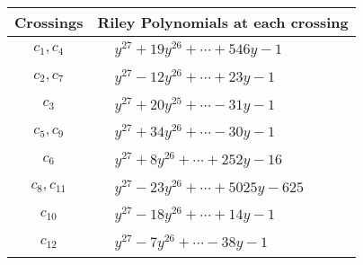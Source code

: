 \documentclass[1p]{elsarticle_modified}
\theoremstyle{definition}
\begin{document}
\begin{tabular}{m{50pt}|m{274pt}}
Crossings & \hspace{64pt}Riley Polynomials at each crossing \\
\hline $$\begin{aligned}c_{1},c_{4}\end{aligned}$$&$\begin{aligned}
&y^{27}+19 y^{26}+\cdots+546 y-1
\end{aligned}$\\
\hline $$\begin{aligned}c_{2},c_{7}\end{aligned}$$&$\begin{aligned}
&y^{27}-12 y^{26}+\cdots+23 y-1
\end{aligned}$\\
\hline $$\begin{aligned}c_{3}\end{aligned}$$&$\begin{aligned}
&y^{27}+20 y^{25}+\cdots-31 y-1
\end{aligned}$\\
\hline $$\begin{aligned}c_{5},c_{9}\end{aligned}$$&$\begin{aligned}
&y^{27}+34 y^{26}+\cdots-30 y-1
\end{aligned}$\\
\hline $$\begin{aligned}c_{6}\end{aligned}$$&$\begin{aligned}
&y^{27}+8 y^{26}+\cdots+252 y-16
\end{aligned}$\\
\hline $$\begin{aligned}c_{8},c_{11}\end{aligned}$$&$\begin{aligned}
&y^{27}-23 y^{26}+\cdots+5025 y-625
\end{aligned}$\\
\hline $$\begin{aligned}c_{10}\end{aligned}$$&$\begin{aligned}
&y^{27}-18 y^{26}+\cdots+14 y-1
\end{aligned}$\\
\hline $$\begin{aligned}c_{12}\end{aligned}$$&$\begin{aligned}
&y^{27}-7 y^{26}+\cdots-38 y-1
\end{aligned}$\\
\hline
\end{tabular}\\~\\
\end{document}
